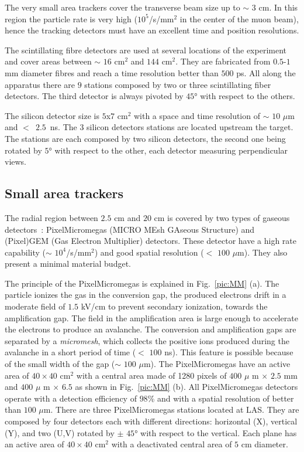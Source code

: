 The very small area trackers cover the transverse beam size up to $\sim$ $3$ cm. In this region the particle rate is very high ($10^5$/s/mm$^2$ in the center of the muon beam), hence the tracking detectors must have an excellent time and position resolutions.

The scintillating fibre detectors are used at several locations of the experiment and cover areas between $\sim$ $16$ cm$^2$ and $144$ cm$^2$. They are fabricated from $0.5$-$1$ mm diameter fibres and reach a time resolution better than $500$ ps. All along the apparatus there are $9$ stations composed by two or three scintillating fiber detectors. The third detector is always pivoted by $45$° with respect to the others.

The silicon detector size is $5$x$7$ cm$^2$ with a space and time resolution of $\sim$ $10$ $\mu$m and $<$~$2.5$~ns. The $3$ silicon detectors stations are located upstream the target. The stations are each composed by two silicon detectors, the second one being rotated by $5$° with respect to the other, each detector measuring perpendicular views.

\subsection{Small area trackers}

The radial region between $2.5$ cm and $20$ cm is covered by two types of gaseous detectors~: PixelMicromegas (MICRO MEsh GAseous Structure) and (Pixel)GEM (Gas Electron Multiplier) detectors. These detector have a high rate capability ($\sim$ $10^4$/s/mm$^2$) and good spatial resolution ($<$ $100$ $\mu$m). They also present a minimal material budget.

The principle of the PixelMicromegas is explained in Fig.~\ref{pic:MM} (a). The particle ionizes the gas in the conversion gap, the produced electrons drift in a moderate field of $1.5$ kV/cm to prevent secondary ionization, towards the amplification gap. The field in the amplification area is large enough to accelerate the electrons to produce an avalanche. The conversion and amplification gaps are separated by a \textit{micromesh}, which collects the positive ions produced during the avalanche in a short period of time ($<$ $100$ ns). This feature is possible because of the small width of the gap ($\sim$ $100$ $\mu$m). The PixelMicromegas have an active area of $40 \times 40$ cm$^2$ with a central area made of 1280 pixels of $400$ $\mu$ m $\times$ $2.5$ mm and $400$ $\mu$ m $\times$ $6.5$ \cite{FloThi} as shown in Fig.~\ref{pic:MM} (b). All PixelMicromegas detectors operate with a detection efficiency of $98$\% and with a spatial resolution of better than $100$ $\mu$m. There are three PixelMicromegas stations located at LAS. They are composed by four detectors each with different directions: horizontal (X), vertical (Y), and two (U,V) rotated by $\pm$ $45$° with respect to the vertical. Each plane has an active area of $40 \times 40$ cm$^2$ with a deactivated central area of $5$ cm diameter.

